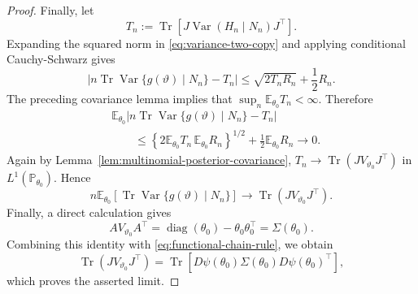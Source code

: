 \documentclass{article}
\theoremstyle{named}
\theoremstyle{named1}
\theoremstyle{plain}
\theoremstyle{remark}
\begin{document}
\begin{proof}
Finally, let
\[
    T_n:=\operatorname{Tr}\left[
        J\operatorname{Var}(H_n\mid N_n)J^\top
    \right].
\]
Expanding the squared norm in \eqref{eq:variance-two-copy} and applying
conditional Cauchy-Schwarz gives
\[
    \left|
        n\operatorname{Tr}\operatorname{Var}\{g(\vartheta)\mid N_n\}
        -T_n
    \right|
    \leq\sqrt{2T_nR_n}+\frac12R_n.
\]
The preceding covariance lemma implies that
$\sup_n\mathbb E_{\theta_0}T_n<\infty$. Therefore
\[
\begin{aligned}
    &\mathbb E_{\theta_0}\left|
        n\operatorname{Tr}\operatorname{Var}\{g(\vartheta)\mid N_n\}
        -T_n
    \right|\\
    &\qquad\leq
    \left\{2\mathbb E_{\theta_0}T_n\,
              \mathbb E_{\theta_0}R_n\right\}^{1/2}
    +\frac12\mathbb E_{\theta_0}R_n
    \rightarrow0.
\end{aligned}
\]
Again by Lemma~\ref{lem:multinomial-posterior-covariance},
$T_n\to\operatorname{Tr}(JV_{\vartheta_0}J^\top)$ in
$L^1(\mathbb P_{\theta_0})$. Hence
\[
    n\mathbb E_{\theta_0}\left[
        \operatorname{Tr}\operatorname{Var}\{g(\vartheta)\mid N_n\}
    \right]
    \rightarrow\operatorname{Tr}(JV_{\vartheta_0}J^\top).
\]
Finally, a direct calculation gives
\[
    AV_{\vartheta_0}A^\top
    =\operatorname{diag}(\theta_0)-\theta_0\theta_0^\top
    =\Sigma(\theta_0).
\]
Combining this identity with \eqref{eq:functional-chain-rule}, we obtain
\[
    \operatorname{Tr}(JV_{\vartheta_0}J^\top)
    =\operatorname{Tr}\left[
        D\psi(\theta_0)\Sigma(\theta_0)D\psi(\theta_0)^\top
    \right],
\]
which proves the asserted limit.
\end{proof}
\end{document}
